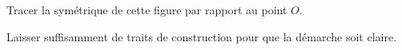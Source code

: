
\begin{exercice}\label{exo2smath-0081}

    Tracer la symétrique de cette figure par rapport au point \( O\).

\begin{center}
   
\end{center}
Laisser suffisamment de traits de construction pour que la démarche soit claire.


\end{exercice}
